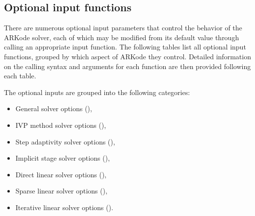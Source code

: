 \documentclass[letterpaper,10pt,english]{sphinxmanual}
\begin{document}
\subsection{Optional input functions}
\label{c_interface/User_callable:cinterface-optionalinputs}\label{c_interface/User_callable:optional-input-functions}
There are numerous optional input parameters that control the behavior
of the ARKode solver, each of which may be modified from its default
value through calling an appropriate input function.  The following
tables list all optional input functions, grouped by which aspect of
ARKode they control.  Detailed information on the calling syntax and
arguments for each function are then provided following each table.

The optional inputs are grouped into the following categories:
\begin{itemize}
\item {} 
General solver options ({\hyperref[c_interface/User_callable:cinterface-arkodeinputtable]{\emph{}}}),

\item {} 
IVP method solver options ({\hyperref[c_interface/User_callable:cinterface-arkodemethodinputtable]{\emph{}}}),

\item {} 
Step adaptivity solver options ({\hyperref[c_interface/User_callable:cinterface-arkodeadaptivityinputtable]{\emph{}}}),

\item {} 
Implicit stage solver options ({\hyperref[c_interface/User_callable:cinterface-cinterface-arkodesolverinputtable]{\emph{}}}),

\item {} 
Direct linear solver options ({\hyperref[c_interface/User_callable:cinterface-arkdlsinputs]{\emph{}}}),

\item {} 
Sparse linear solver options ({\hyperref[c_interface/User_callable:cinterface-arkslsinputs]{\emph{}}}),

\item {} 
Iterative linear solver options ({\hyperref[c_interface/User_callable:cinterface-arkspilsinputs]{\emph{}}}).

\end{itemize}
\end{document}

